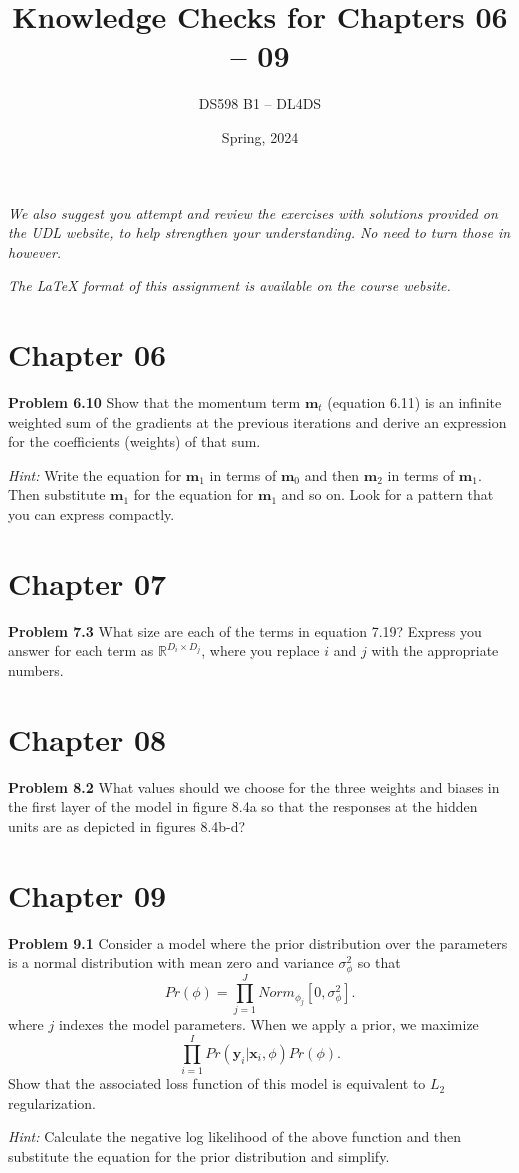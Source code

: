 \documentclass[11pt, oneside]{article}   	%
\title{Knowledge Checks for Chapters 06 -- 09}
\author{DS598 B1 -- DL4DS}
\date{Spring, 2024}							%
\begin{document}
\maketitle

\textit{We also suggest you attempt and review the exercises with solutions provided
on the UDL website, to help strengthen your understanding. No need to turn 
those in however.}

\textit{The \LaTeX \hspace{1pt} format of this assignment is available on the course website.}

\section*{Chapter 06}

\textbf{Problem 6.10} Show that the momentum term \(\mathbf{m}_t\) (equation 6.11) is an
infinite weighted sum of the gradients at the previous iterations and derive an
expression for the coefficients (weights) of that sum.

\textit{Hint:} Write the equation for \(\mathbf{m}_1\) in terms of \(\mathbf{m}_0\)
and then \(\mathbf{m}_2\) in terms of \(\mathbf{m}_1\). Then substitute 
\(\mathbf{m}_1\) for the equation for \(\mathbf{m}_1\) and so on. Look for a 
pattern that you can express compactly.

\section*{Chapter 07}

\textbf{Problem 7.3} What size are each of the terms in equation 7.19? Express
you answer for each term as \( \mathbb{R}^{D_i \times D_j} \), where you replace
\(i\) and \(j\) with the appropriate numbers.

\section*{Chapter 08} 

\textbf{Problem 8.2} What values should we choose for the three weights and
biases in the first layer of the model in figure 8.4a so that the responses at
the hidden units are as depicted in figures 8.4b-d?

\section*{Chapter 09}

\textbf{Problem 9.1} Consider a model where the prior distribution over the
parameters is a normal distribution with mean zero and variance
\(\sigma^2_\phi\) so that
\[Pr(\phi) = \prod_{j=1}^{J} Norm_{\phi_j}[0, \sigma^2_\phi].\]
where \(j\) indexes the model parameters. When we apply a prior, we maximize
\[\prod_{i=1}^{I} Pr(\mathbf{y}_i|\mathbf{x}_i, \phi) Pr(\phi).\] 
Show that the associated loss function of this model is equivalent to \(L_2\) 
regularization.

\textit{Hint:} Calculate the negative log likelihood of the above function and 
then substitute the equation for the prior distribution and simplify.
\end{document}
